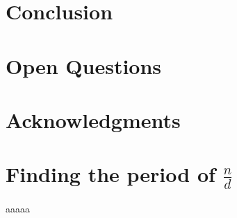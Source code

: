 \documentclass[11pt,titlepage]{article}
\begin{document}



\section{Conclusion}

\section{Open Questions}


\section*{Acknowledgments}


\appendix
\section{Finding the period of $\frac{n}{d}$}
\label{AppendixPeriod}
aaaaa



\end{document}
